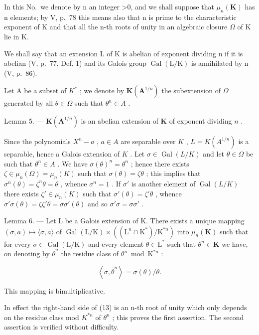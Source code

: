 In this No.~we denote by n an integer \textgreater0, and we shall suppose that \(\mu_{n}(\mathbf{K})\) has n elements; by V, p.~78 this means also that n is prime to the characteristic exponent of K and that all the n-th roots of unity in an algebraic closure \(\Omega\) of K lie in K.

We shall say that an extension L of K is abelian of exponent dividing n if it is abelian (V, p.~77, Def. 1) and its Galois group \(\operatorname{Gal}(\mathrm{L}/\mathrm{K})\) is annihilated by n (V, p.~86).

Let A be a subset of \(K^{*}\) ; we denote by \(\mathbf{K}(\mathbf{A}^{1/n})\) the subextension of \(\Omega\) generated by all \(\theta \in \Omega\) such that \(\theta^{n} \in A\) .

Lemma 5. --- \(\mathbf{K}(\mathbf{A}^{1 / n})\) is an abelian extension of \(\mathbf{K}\) of exponent dividing \(n\) .

Since the polynomials \(X^n - a\) , \(a \in A\) are separable over \(K\) , \(L = K(A^{1/n})\) is a separable, hence a Galois extension of \(K\) . Let \(\sigma \in \operatorname{Gal}(L/K)\) and let \(\theta \in \Omega\) be such that \(\theta^n \in A\) . We have \(\sigma(\theta)^n = \theta^n\) ; hence there exists \(\zeta \in \mu_n(\Omega) = \mu_n(K)\) such that \(\sigma(\theta) = \zeta\theta\) ; this implies that \(\sigma^n(\theta) = \zeta^n\theta = \theta\) , whence \(\sigma^n = 1\) . If \(\sigma'\) is another element of \(\operatorname{Gal}(L/K)\) there exists \(\zeta' \in \mu_n(K)\) such that \(\sigma'(\theta) = \zeta'\theta\) , whence \(\sigma' \sigma(\theta) = \zeta\zeta'\theta = \sigma\sigma'(\theta)\) and so \(\sigma' \sigma = \sigma\sigma'\) .

Lemma 6. --- Let L be a Galois extension of K. There exists a unique mapping \((\sigma, a) \mapsto \langle \sigma, a \rangle\) of \(\operatorname{Gal}(\mathrm{L} / \mathrm{K}) \times ((\mathrm{L}^n \cap \mathrm{K}^*) / \mathrm{K}^{*n})\) into \(\mu_n(\mathbf{K})\) such that for every \(\sigma \in \operatorname{Gal}(\mathrm{L} / \mathrm{K})\) and every element \(\theta \in \mathrm{L}^*\) such that \(\theta^n \in \mathbf{K}\) we have, on denoting by \(\bar{\theta}^n\) the residue class of \(\theta^n \bmod \mathrm{K}^{*n}\) :

\[
\left\langle \sigma , \bar {\theta} ^ {n} \right\rangle = \sigma (\theta) / \theta .\tag{13}
\]

This mapping is bimultiplicative.

In effect the right-hand side of (13) is an n-th root of unity which only depends on the residue class mod \(K^{*n}\) of \(\theta^{n}\) ; this proves the first assertion. The second assertion is verified without difficulty.

